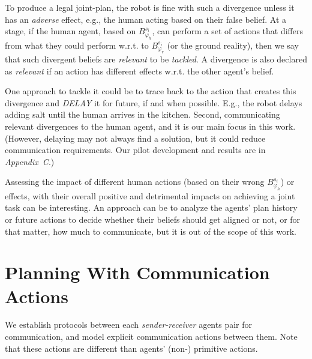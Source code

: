 \documentclass[letterpaper]{article} %
\begin{document}
To produce a legal joint-plan, the robot is fine with such a divergence unless it has an \textit{adverse} effect, e.g., the human acting based on their false belief.
At a stage, if the human agent, based on $\mathit{B}_{\varphi_h}^{s_i}$, can perform a set of actions that differs from what they could perform w.r.t. to $\mathit{B}_{\varphi_r}^{s_i}$ (or the ground reality), then we say that such divergent beliefs are \textit{relevant} to be \textit{tackled}.
A divergence is also declared as \textit{relevant} if an action has different effects w.r.t. the other agent's belief.

One approach to tackle it could be to trace back to the action that creates this divergence and {\em DELAY} it for future, if and when possible. E.g., the robot delays adding salt until the human arrives in the kitchen. 
Second, communicating relevant divergences to the human agent, and it is our main focus in this work. (However, delaying may not always find a solution, but it could reduce communication requirements. Our pilot development and results are in \textit{Appendix~C}.)

Assessing the impact of different human actions (based on their wrong $\mathit{B}_{\varphi_h}^{s_i}$) or effects, with their overall positive and detrimental impacts on achieving a joint task can be interesting.
An approach can be to analyze the agents' plan history or future actions to decide whether their beliefs should get aligned or not, or for that matter, how much to communicate, but it is out of the scope of this work. 

\section{Planning With Communication Actions}
We establish protocols between each \textit{sender-receiver} agents pair for communication, 
and model explicit communication actions between them. 
Note that these actions are different than agents' (non-) primitive actions.
\end{document}
